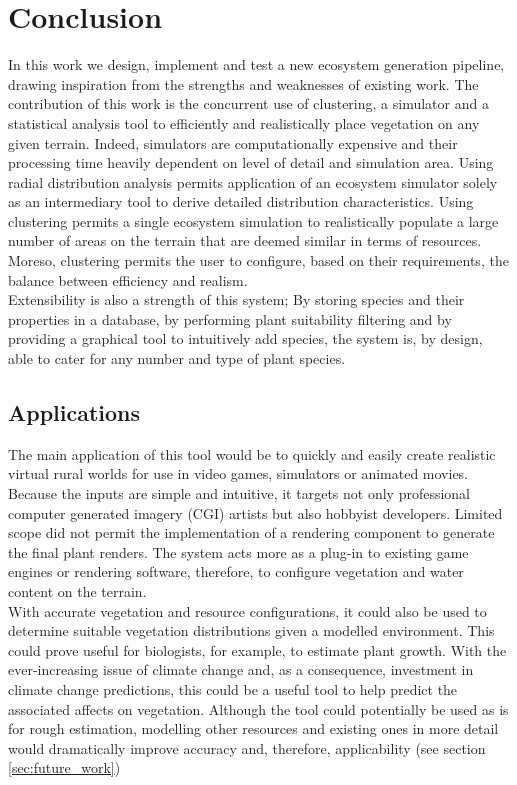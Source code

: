 \chapter{Conclusion} \label{chap:conclusion}

In this work we design, implement and test a new ecosystem generation pipeline, drawing inspiration from the strengths and weaknesses of existing work. The contribution of this work is the concurrent use of clustering, a simulator and a statistical analysis tool to efficiently and realistically place vegetation on any given terrain. Indeed, simulators are computationally expensive and their processing time heavily dependent on level of detail and simulation area. Using radial distribution analysis permits application of an ecosystem simulator solely as an intermediary tool to derive detailed distribution characteristics. Using clustering permits a single ecosystem simulation to realistically populate a large number of areas on the terrain that are deemed similar in terms of resources. Moreso, clustering permits the user to configure, based on their requirements, the balance between efficiency and realism. \\
Extensibility is also a strength of this system; By storing species and their properties in a database, by performing plant suitability filtering and by providing a graphical tool to intuitively add species, the system is, by design, able to cater for any number and type of plant species.\\

\section{Applications} \label{sec:applications}

The main application of this tool would be to quickly and easily create realistic virtual rural worlds for use in video games, simulators or animated movies. Because the inputs are simple and intuitive, it targets not only professional computer generated imagery (CGI) artists but also hobbyist developers. Limited scope did not permit the implementation of a rendering component to generate the final plant renders. The system acts more as a plug-in to existing game engines or rendering software, therefore, to configure vegetation and water content on the terrain.\\

With accurate vegetation and resource configurations, it could also be used to determine suitable vegetation distributions given a modelled environment. This could prove useful for biologists, for example, to estimate plant growth. With the ever-increasing issue of climate change and, as a consequence, investment in climate change predictions, this could be a useful tool to help predict the associated affects on vegetation. Although the tool could potentially be used as is for rough estimation, modelling other resources and existing ones in more detail would dramatically improve accuracy and, therefore, applicability (see section \ref{sec:future_work})\\

